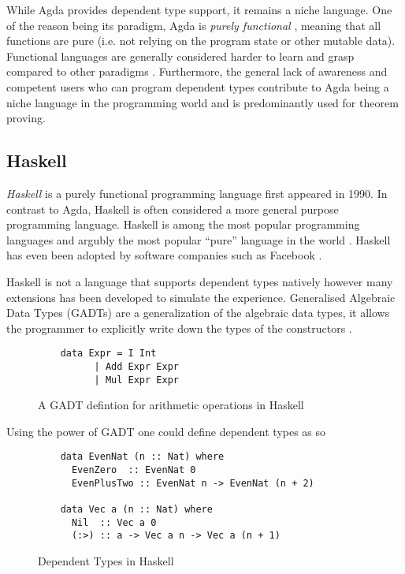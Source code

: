 \documentclass[a4paper,12pt]{report}
\begin{document}
\par
While Agda provides dependent type support, it remains a niche language. One of 
the reason being its paradigm, Agda is \textit{purely functional} \cite{purelyFP}, meaning that 
all functions are pure (i.e. not relying on the program state or other mutable 
data). Functional languages are generally considered harder to learn and grasp 
compared to other paradigms \cite{fpHarder}. Furthermore, the general lack of 
awareness and competent users who can program dependent types contribute to Agda 
being a niche language in the programming world and is 
predominantly used for theorem proving.

\subsection{Haskell}
\textit{Haskell} \cite{haskell} is a purely functional programming language first appeared in 1990. In 
contrast to Agda, Haskell is often considered a more general purpose programming 
language. Haskell is among the most popular programming languages and argubly 
the most popular ``pure'' language in the world \cite{pypl}. 
Haskell has even been adopted by software companies such as Facebook \cite{haskellFB}.

\par
Haskell is not a language that supports dependent types natively however many 
extensions has been developed to simulate the experience. 
Generalised Algebraic Data Types (GADTs) are a generalization of the 
algebraic data types, it allows the programmer to 
explicitly write down the types of the constructors \cite{haskellGADT}. 
\begin{figure}[H]
  \begin{lstlisting}
    data Expr = I Int        
          | Add Expr Expr 
          | Mul Expr Expr 
  \end{lstlisting}
  \caption{A GADT defintion for arithmetic operations in Haskell}
\end{figure}

Using the power of GADT one could define dependent types as so

\begin{figure}[H]
  \begin{lstlisting}      
    data EvenNat (n :: Nat) where
      EvenZero  :: EvenNat 0
      EvenPlusTwo :: EvenNat n -> EvenNat (n + 2)
      
    data Vec a (n :: Nat) where
      Nil  :: Vec a 0
      (:>) :: a -> Vec a n -> Vec a (n + 1)
  \end{lstlisting}
  \caption{Dependent Types in Haskell}
\end{figure}
\end{document}
